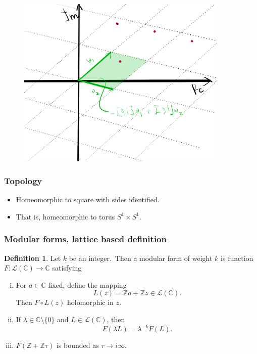 \documentclass[usenames,dvipsnames]{beamer}
\theoremstyle{definition}
\newtheorem{defi}{Definition}
\begin{document}
\begin{frame}
  \frametitle{}
  \begin{figure}[h]
    \centering
    \includegraphics[width=0.9\textwidth]{lattice.png}
  \end{figure}
\end{frame}

\begin{frame}
  \frametitle{Topology}
  \begin{itemize}
    \item Homeomorphic to square with sides identified.\pause
    \item That is, homeomorphic to torus $S^1\times S^1$.
  \end{itemize}
\end{frame}

\begin{frame}
  \frametitle{Modular forms, lattice based definition}
  \begin{defi}
    Let $k$ be an integer.\pause~Then a modular form of weight $k$ is function $F:\mathcal{L}(\mathbb{C})\to\mathbb{C}$ satisfying\pause
    \begin{enumerate}[(i)]
      \item For $a\in\mathbb{C}$ fixed, define the mapping\pause
        \[L(z)=\mathbb{Z}a+\mathbb{Z}z\in\mathcal{L}(\mathbb{C}).\]\pause
        Then $F\circ L(z)$ holomorphic in $z$.\pause
      \item If $\lambda\in\mathbb{C}\setminus\{0\}$ and $L\in\mathcal{L}(\mathbb{C})$, then\pause
        \[F(\lambda L)=\lambda^{-k}F(L).\]\pause
      \item $F(\mathbb{Z}+\mathbb{Z}\tau)$ is bounded as $\tau\to i\infty$.
    \end{enumerate}
  \end{defi}
\end{frame}
\end{document}
